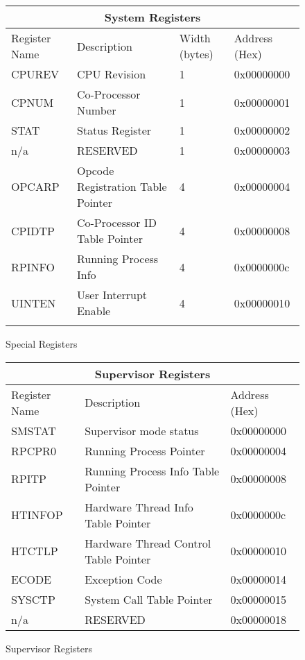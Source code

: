 \documentclass[letterpaper, 11pt]{article}
\begin{document}
\begin{figure}
	
	\caption{Special Registers}
	\begin{center}
		\fontsize{6}{8}\selectfont
		\begin{tabular}{|l|l|l|l|}
			\hline
			\multicolumn{4}{|c|}{System Registers} \\
			\hline
			Register Name 	& Description 				 		& Width (bytes) 	& Address (Hex) \\ \hline
			CPUREV  		& CPU Revision 				 		& 	1				& 0x00000000 	\\ \hline
			CPNUM			& Co-Processor Number		 		&	1				& 0x00000001 	\\ \hline
			STAT			& Status Register			 		&	1				& 0x00000002 	\\ \hline
			n/a				& RESERVED				 	 		&	1				& 0x00000003 	\\ \hline
			OPCARP			& Opcode Registration Table Pointer	&	4				& 0x00000004 	\\ \hline
			CPIDTP 			& Co-Processor ID Table Pointer 	& 	4				& 0x00000008 	\\ \hline
			RPINFO			& Running Process Info				&	4				& 0x0000000c 	\\ \hline
			UINTEN			& User Interrupt Enable				&	4				& 0x00000010	\\ \hlinw

		\end{tabular}
	\end{center}
\end{figure}

\begin{figure}
	\caption{Supervisor Registers}
	
	\begin{center}
		\fontsize{6}{8}\selectfont
		\begin{tabular}{|l|l|l|}
			\hline
			\multicolumn{3}{|c|}{Supervisor Registers} \\
			\hline
			Register Name 	& Description 								& Address (Hex) \\ \hline
			SMSTAT 			& Supervisor mode status 					& 0x00000000 	\\ \hline
			RPCPR0 			& Running Process Pointer 					& 0x00000004	\\ \hline 
			RPITP			& Running Process Info Table Pointer		& 0x00000008	\\ \hline
			HTINFOP			& Hardware Thread Info Table Pointer		& 0x0000000c 	\\ \hline
			HTCTLP 			& Hardware Thread Control Table Pointer		& 0x00000010 	\\ \hline
			ECODE			& Exception Code							& 0x00000014	\\ \hline
			SYSCTP			& System Call Table Pointer					& 0x00000015	\\ \hline
			n/a				& RESERVED									& 0x00000018	\\ \hline
		\end{tabular}
	\end{center}
	
\end{figure}
\end{document}
